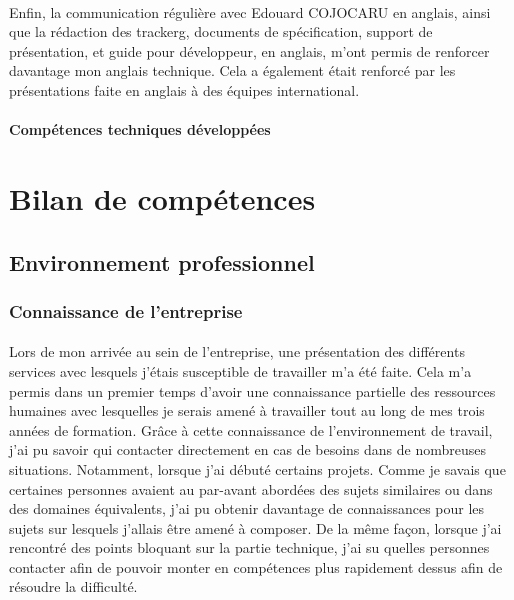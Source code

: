 \documentclass[12pt,a4paper]{report}
\begin{document}
\paragraph*{}Enfin, la communication régulière avec Edouard COJOCARU en anglais,
ainsi que la rédaction des \gls{trackerg}, documents de spécification, support de présentation, et guide pour développeur, en anglais, m’ont permis de renforcer davantage mon anglais technique. Cela a également était renforcé par les présentations faite en anglais à des équipes international.
\paragraph{Compétences techniques développées}
\paragraph*{}

\newpage
\section{Bilan de compétences} 
\subsection{Environnement professionnel}
\subsubsection{Connaissance de l'entreprise}
\paragraph*{}Lors de mon arrivée au sein de l'entreprise, une présentation des différents services avec lesquels j'étais susceptible de travailler m'a été faite. Cela m'a permis dans un premier temps d'avoir une connaissance partielle des ressources humaines avec lesquelles je serais amené à travailler tout au long de mes trois années de formation. Grâce à cette connaissance de l'environnement de travail, j'ai pu savoir qui contacter directement en cas de besoins dans de nombreuses situations. Notamment, lorsque j'ai débuté certains projets. Comme je savais que certaines personnes avaient au par-avant abordées des sujets similaires ou dans des domaines équivalents, j'ai pu obtenir davantage de connaissances pour les sujets sur lesquels j'allais être amené à composer. De la même façon, lorsque j'ai rencontré des points bloquant sur la partie technique, j'ai su quelles personnes contacter afin de pouvoir monter en compétences plus rapidement dessus afin de résoudre la difficulté.
\end{document}
